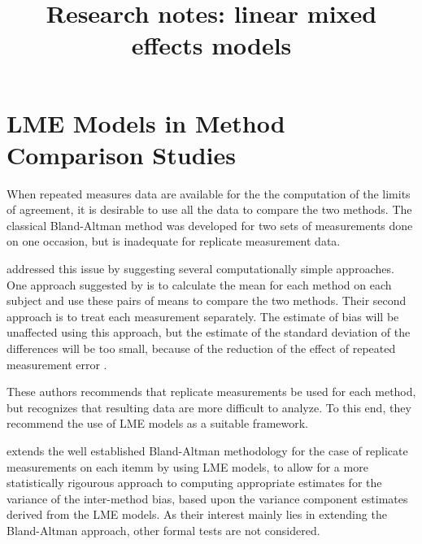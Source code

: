 \documentclass[12pt, a4paper]{report}
\title{Research notes: linear mixed effects models}
\author{ } \date{ }
\theoremstyle{plain}
\theoremstyle{definition}
\theoremstyle{remark}
\begin{document}
\tableofcontents
\newpage
	\section{LME Models in Method Comparison Studies}


When repeated measures data are available for the the computation of the limits of agreement, it is desirable to use all the data to compare the two methods. The classical Bland-Altman method was developed for two sets of measurements done on one occasion, but is inadequate for replicate measurement data. 

\citet{BA99} addressed this issue by suggesting several computationally simple approaches.  One approach suggested by \citet{BA99} is to calculate the mean for each method on each subject and use these pairs of means to compare the two methods. Their second approach is to treat each measurement separately. 
The estimate of bias will be unaffected using this approach, but the estimate of the standard deviation of the differences will be too small, because of the reduction of the effect of repeated measurement error \citep{BXC2004,BXC2008}. 

These authors recommends that replicate measurements be used for each method, but recognizes that resulting data are more difficult to analyze. To this end, they recommend the use of LME models as a suitable framework.

	



\citet{BXC2008} extends the well established Bland-Altman methodology for the case of replicate measurements on each itemm by using LME models, to allow for a more statistically rigourous approach to computing appropriate estimates for the variance of the inter-method bias, based upon the variance component estimates derived from the LME models. As their interest mainly lies in extending the Bland-Altman approach, other formal tests are not considered.  
\end{document}
